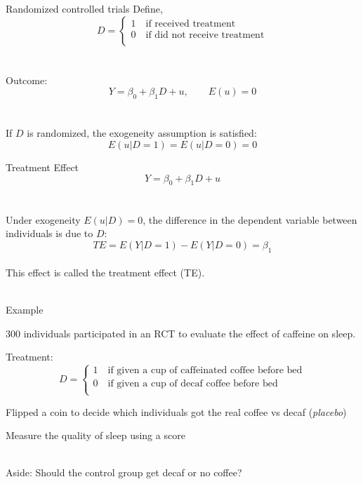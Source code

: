 \documentclass{./../div_teaching_slides}
\begin{document}
\begin{frame}{Randomized controlled trials}
Define, $$D =  \begin{cases}
  	1 \quad \text{if received treatment} \\
  	0 \quad \text{if did not receive treatment} \\
  \end{cases} $$ \\~\\
Outcome:
$$ Y = \beta_0 + \beta_1 D + u , \quad \quad E(u)=0 $$ \\~\\
If $D$ is randomized, the exogeneity assumption is satisfied:
$$ E(u|D=1) = E(u|D=0) =0$$
\end{frame}

\begin{frame}{Treatment Effect}
$$ Y = \beta_0 + \beta_1 D + u $$ \\~\\
Under exogeneity $E(u|D)=0$, the difference in the dependent variable between individuals is due to $D$: \\
$$ TE =  E(Y|D=1)-E(Y|D=0) = \beta_1 $$ \\
\vspace{1em}
This effect is called the treatment effect (TE). \\~\\
\end{frame}

\begin{frame}{Example}
\vspace{-0.5em}
\begin{witemize}
  \item 300 individuals participated in an RCT to evaluate the effect of caffeine on sleep.
  \item Treatment: $$D =  \begin{cases}
  	1 \quad \text{if given a cup of caffeinated coffee before bed} \\
  	0 \quad \text{if given a cup of decaf coffee before bed} \\
  \end{cases} $$ 
  \item Flipped a coin to decide which individuals got the real coffee vs decaf (\textit{placebo})
  \item Measure the quality of sleep using a score \\~\\
\end{witemize}
Aside: Should the control group get decaf or no coffee?
\end{frame}
\end{document}
